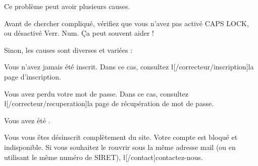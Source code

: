 Ce problème peut avoir plusieurs causes.

Avant de chercher compliqué, vérifiez que vous n'avez pas activé CAPS LOCK, ou désactivé Verr. Num. Ça peut souvent aider !

Sinon, les causes sont diverses et variées :
\item Vous n'avez jamais été inscrit. Dans ce cas, consultez \l[/correcteur/inscription]{la page d'inscription}.
\item Vous avez perdu votre mot de passe. Dans ce cas, consultez \l[/correcteur/recuperation]{la page de récupération de mot de passe}.
\item Vous avez été .
\item Vous vous êtes désinscrit complètement du site. Votre compte est bloqué et indisponible. Si vous souhaitez le rouvrir sous la même adresse mail (ou en utilisant le même numéro de SIRET), \l[/contact]{contactez-nous}.
